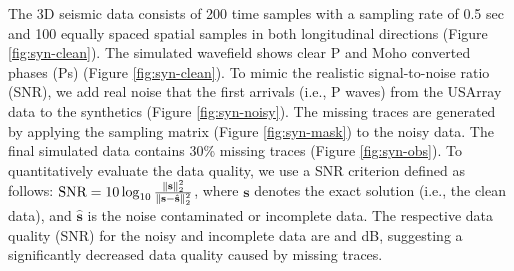The 3D seismic data consists of 200 time samples with a sampling rate of 0.5 sec and 100 equally spaced spatial samples in both longitudinal  directions (Figure \ref{fig:syn-clean}).  The simulated wavefield shows clear P and Moho converted phases (Ps) (Figure \ref{fig:syn-clean}). To mimic the realistic signal-to-noise ratio (SNR), we add real noise that  the first arrivals (i.e., P waves) from the USArray data to the synthetics (Figure \ref{fig:syn-noisy}). The missing traces are generated by applying the sampling matrix (Figure \ref{fig:syn-mask}) to the noisy data. The final simulated data contains 30\% missing traces (Figure \ref{fig:syn-obs}). To quantitatively evaluate the data quality, we use a SNR criterion defined as follows: $\text{SNR}=10\log_{10}\frac{\Arrowvert \mathbf{s} \Arrowvert_2^2}{\Arrowvert \mathbf{s} -\hat{\mathbf{s}}\Arrowvert_2^2}$, where $\mathbf{s}$ denotes the exact solution (i.e., the clean data), and $\hat{\mathbf{s}}$ is the noise contaminated or incomplete data. The respective data quality  (SNR) for the noisy and  incomplete data are  and  dB, suggesting a significantly decreased data quality caused by missing traces. 

